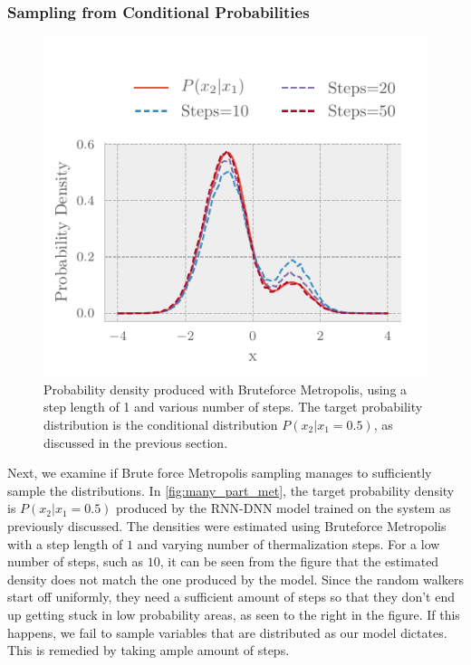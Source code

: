 \subsubsection{Sampling from Conditional Probabilities}

\begin{figure}[H]
	\includegraphics[]{figures/many_part_met.pdf}
	\caption{Probability density produced with Bruteforce Metropolis, using a step length of 1 and various number of steps. The target probability distribution is the conditional distribution $P(x_2|x_1=0.5)$, as discussed in the previous section.} 
	\label{fig:many_part_met}
\end{figure}

Next, we examine if Brute force Metropolis sampling manages to 
sufficiently sample the distributions.
In \autoref{fig:many_part_met}, the target probability density is
$P(x_2|x_1=0.5)$ produced by the RNN-DNN model trained on the system as
previously discussed. The densities were estimated using Bruteforce Metropolis
with a step length of $1$ and varying number of thermalization steps. For a
low number of steps, such as $10$, it can be seen from the figure that the
estimated density does not match the one produced by the model. Since the random
walkers start off uniformly, they need a sufficient amount of steps so that they
don't end up getting stuck in low probability areas, as seen to the right in the
figure. If this happens, we fail to sample variables that are distributed as our
model dictates. This is remedied by taking ample amount of steps.
